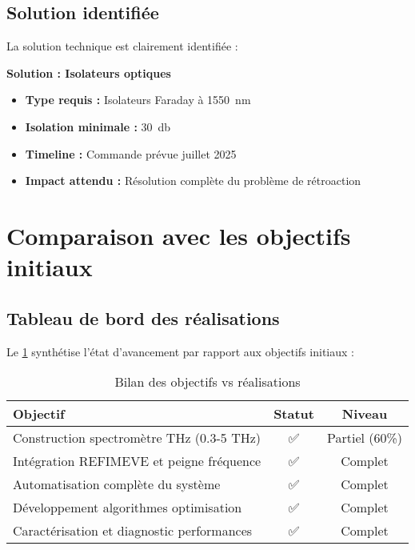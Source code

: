 \subsection{Solution identifiée}

La solution technique est clairement identifiée :

\begin{remark}
\textbf{Solution : Isolateurs optiques}
\begin{itemize}
    \item \textbf{Type requis :} Isolateurs Faraday à \SI{1550}{\nano\meter}
    \item \textbf{Isolation minimale :} \SI{30}{\decibel}
    \item \textbf{Timeline :} Commande prévue juillet 2025
    \item \textbf{Impact attendu :} Résolution complète du problème de rétroaction
\end{itemize}
\end{remark}

\section{Comparaison avec les objectifs initiaux}

\subsection{Tableau de bord des réalisations}

Le \cref{tab:objectifs_realises} synthétise l'état d'avancement par rapport aux objectifs initiaux :

\begin{table}[ht]
    \centering
    \caption{Bilan des objectifs vs réalisations}
    \label{tab:objectifs_realises}
    \begin{tabular}{p{}cc}
        \toprule
        \textbf{Objectif} & \textbf{Statut} & \textbf{Niveau} \\
        \midrule
        Construction spectromètre THz (0.3-5 THz) & ✅ & Partiel (60\%) \\
        Intégration REFIMEVE et peigne fréquence & ✅ & Complet \\
        Automatisation complète du système & ✅ & Complet \\
        Développement algorithmes optimisation & ✅ & Complet \\
        Caractérisation et diagnostic performances & ✅ & Complet \\
        \bottomrule
    \end{tabular}
\end{table}

